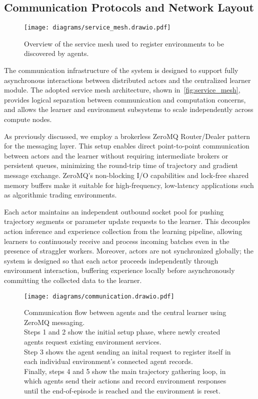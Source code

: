 \documentclass[11pt]{article}
\begin{document}
    \subsection{Communication Protocols and Network Layout}
    \label{subsec:communication}

    \begin{figure}[htb]
        \centering
        \texttt{[image: diagrams/service\_mesh.drawio.pdf]}
        \caption{Overview of the service mesh used to register environments to be discovered by agents.}
        \label{fig:service_mesh}
    \end{figure}

    The communication infrastructure of the system is designed to support fully asynchronous interactions
    between distributed actors and the centralized learner module.
    The adopted service mesh architecture, shown in~\autoref{fig:service_mesh}, provides logical separation between communication and computation concerns,
    and allows the learner and environment subsystems to scale independently across compute nodes.

    As previously discussed, we employ a brokerless ZeroMQ Router/Dealer pattern for the messaging layer.
    This setup enables direct point-to-point communication between actors and the learner without requiring intermediate brokers or persistent queues,
    minimizing the round-trip time of trajectory and gradient message exchange.
    ZeroMQ's non-blocking I/O capabilities and lock-free shared memory buffers make it suitable for high-frequency,
    low-latency applications such as algorithmic trading environments.

    Each actor maintains an independent outbound socket pool for pushing trajectory segments or parameter update requests to the learner.
    This decouples action inference and experience collection from the learning pipeline,
    allowing learners to continuously receive and process incoming batches even in the presence of straggler workers.
    Moreover, actors are not synchronized globally; the system is designed so that each actor proceeds independently through environment interaction,
    buffering experience locally before asynchronously committing the collected data to the learner.

    \begin{figure}[htb]
        \centering
        \texttt{[image: diagrams/communication.drawio.pdf]}
        \caption{
            Communication flow between agents and the central learner using ZeroMQ messaging.\\
            Steps 1 and 2 show the initial setup phase, where newly created agents request existing environment services.\\
            Step 3 shows the agent sending an inital request to register itself in each individual environment's connected agent records.\\
            Finally, steps 4 and 5 show the main trajectory gathering loop, in which agents send their actions and
            record environment responses until the end-of-episode is reached and the environment is reset.
        }
        \label{fig:communication}
    \end{figure}
\end{document}
